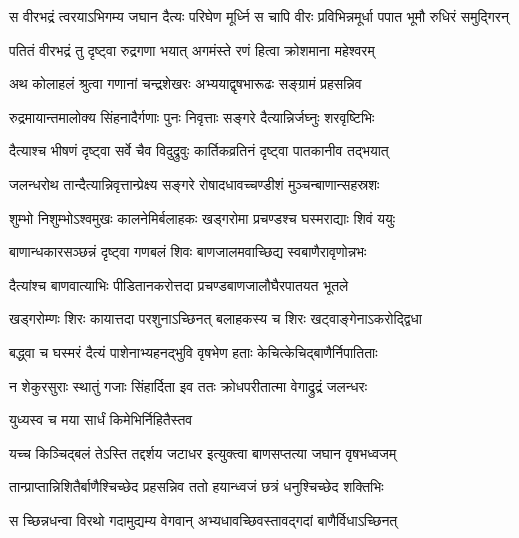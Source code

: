 \twolineshloka
{स वीरभद्रं त्वरयाऽभिगम्य जघान दैत्यः परिघेण मूर्ध्नि}
{स चापि वीरः प्रविभिन्नमूर्धा पपात भूमौ रुधिरं समुद्गिरन्} %





\twolineshloka
{पतितं वीरभद्रं तु दृष्ट्वा रुद्रगणा भयात्}
{अगमंस्ते रणं हित्वा क्रोशमाना महेश्वरम्} %

\twolineshloka
{अथ कोलाहलं श्रुत्वा गणानां चन्द्रशेखरः}
{अभ्ययाद्वृषभारूढः सङ्ग्रामं प्रहसन्निव} %

\twolineshloka
{रुद्रमायान्तमालोक्य सिंहनादैर्गणाः पुनः}
{निवृत्ताः सङ्गरे दैत्यान्निर्जघ्नुः शरवृष्टिभिः} %

\twolineshloka
{दैत्याश्च भीषणं दृष्ट्वा सर्वे चैव विदुद्रुवुः}
{कार्तिकव्रतिनं दृष्ट्वा पातकानीव तद्भयात्} %

\twolineshloka
{जलन्धरोथ तान्दैत्यान्निवृत्तान्प्रेक्ष्य सङ्गरे}
{रोषादधावच्चण्डीशं मुञ्चन्बाणान्सहस्रशः} %

\twolineshloka
{शुम्भो निशुम्भोऽश्वमुखः कालनेमिर्बलाहकः}
{खड्गरोमा प्रचण्डश्च घस्मराद्याः शिवं ययुः} %

\twolineshloka
{बाणान्धकारसञ्छन्नं दृष्ट्वा गणबलं शिवः}
{बाणजालमवाच्छिद्य स्वबाणैरावृणोन्नभः} %

\twolineshloka
{दैत्यांश्च बाणवात्याभिः पीडितानकरोत्तदा}
{प्रचण्डबाणजालौघैरपातयत भूतले} %

\twolineshloka
{खड्गरोम्णः शिरः कायात्तदा परशुनाऽच्छिनत्}
{बलाहकस्य च शिरः खट्वाङ्गेनाऽकरोद्द्विधा} %

\twolineshloka
{बद्ध्वा च घस्मरं दैत्यं पाशेनाभ्यहनद्भुवि}
{वृषभेण हताः केचित्केचिद्बाणैर्निपातिताः} %

\twolineshloka
{न शेकुरसुराः स्थातुं गजाः सिंहार्दिता इव}
{ततः क्रोधपरीतात्मा वेगाद्रुद्रं जलन्धरः} %




\onelineshloka
{युध्यस्व च मया सार्धं किमेभिर्निहितैस्तव} %

\twolineshloka
{यच्च किञ्चिद्बलं तेऽस्ति तद्दर्शय जटाधर}
{इत्युक्त्वा बाणसप्तत्या जघान वृषभध्वजम्} %

\twolineshloka
{तान्प्राप्तान्निशितैर्बाणैश्चिच्छेद प्रहसन्निव}
{ततो हयान्ध्वजं छत्रं धनुश्चिच्छेद शक्तिभिः} %

\twolineshloka
{स च्छिन्नधन्वा विरथो गदामुद्यम्य वेगवान्}
{अभ्यधावच्छिवस्तावद्गदां बाणैर्विधाऽच्छिनत्} %

